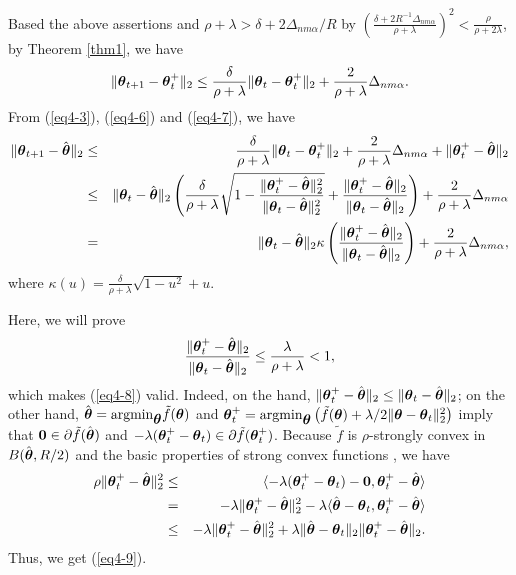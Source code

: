 \documentclass[12pt,a4paper]{article}%
\newcommand{\be}{\begin{equation}}
\newcommand{\ee}{\end{equation}}
\newcommand\bes{\begin{eqnarray}}
\newcommand\ees{\end{eqnarray}}
\newcommand \vc[1]{{\mbox{\boldmath${#1}$}}}
\newcommand \vtheta{\vc \theta}
\numberwithin{equation}{section}
\newcommand{\sbr}[1]{\left(#1\right)}        %
\begin{document}
Based the above assertions and $\rho+\lambda>\delta+2\Delta_{nm\alpha}/R$ by $\sbr{\frac{\delta+2R^{-1}\Delta_{nm\alpha}}{\rho+\lambda}}^2<\frac{\rho}{\rho+2\lambda}$, by Theorem \ref{thm1}, we have
\be\label{eq4-7}
\|\vtheta_{t+1}-\vtheta_t^+\|_2\leq \frac{\delta}{\rho+\lambda}\|\vtheta_t-\vtheta_t^+\|_2+\frac{2}{\rho+\lambda}\Delta_{nm\alpha}.
\ee
From (\ref{eq4-3}), (\ref{eq4-6}) and (\ref{eq4-7}), we have
\bes\label{eq4-8}
\|\vtheta_{t+1}-\hat{\vtheta}\|_2&\leq& \frac{\delta}{\rho+\lambda}\|\vtheta_t-\vtheta_t^+\|_2+\frac{2}{\rho+\lambda}\Delta_{nm\alpha}+\|\vtheta_t^+-\hat{\vtheta}\|_2\nonumber\\
&\leq&\|\vtheta_t-\hat{\vtheta}\|_2\sbr{\frac{\delta}{\rho+\lambda}\sqrt{1-\frac{\|\vtheta_t^+-\hat{\vtheta}\|_2^2}{\|\vtheta_t-\hat{\vtheta}\|_2^2}}
+\frac{\|\vtheta_t^+-\hat{\vtheta}\|_2}{\|\vtheta_t-\hat{\vtheta}\|_2}}+\frac{2}{\rho+\lambda}\Delta_{nm\alpha}\nonumber\\
&=&\|\vtheta_t-\hat{\vtheta}\|_2\kappa\sbr{\frac{\|\vtheta_t^+-\hat{\vtheta}\|_2}{\|\vtheta_t-\hat{\vtheta}\|_2}}+\frac{2}{\rho+\lambda}\Delta_{nm\alpha},
\ees
where $\kappa(u)=\frac{\delta}{\rho+\lambda}\sqrt{1-u^2}+u$.

Here, we will prove
\be\label{eq4-9}
\frac{\|\vtheta_t^+-\hat{\vtheta}\|_2}{\|\vtheta_t-\hat{\vtheta}\|_2}\leq \frac{\lambda}{\rho+\lambda}<1,
\ee
which makes (\ref{eq4-8}) valid. Indeed, on the hand, $\|\vtheta_t^+-\hat{\vtheta}\|_2
\leq\|\vtheta_t-\hat{\vtheta}\|_2$; on the other hand, $\hat{\vtheta}=\mathrm{argmin}_\vtheta\tilde{f}(\vtheta)$ and $\vtheta_t^+=\mathrm{argmin}_\vtheta\sbr{\tilde{f}(\vtheta)+\lambda/2\|\vtheta-\vtheta_t\|_2^2}$ imply that $\vc 0\in \partial\tilde{f}(\hat{\vtheta})$ and $-\lambda(\vtheta_t^+-\vtheta_t)\in\partial\tilde{f}(\vtheta_t^+)$.
Because $\tilde{f}$ is $\rho$-strongly convex in $B(\hat{\vtheta},R/2)$ and the basic properties of strong convex functions \citep{Nesterov2004}, we have
\bes
\rho\|\vtheta_t^+-\hat{\vtheta}\|_2^2&\leq& \langle-\lambda(\vtheta_t^+-\vtheta_t)-\vc 0,\vtheta_t^+-\hat{\vtheta}\rangle\nonumber\\
&=&-\lambda\|\vtheta_t^+-\hat{\vtheta}\|_2^2-\lambda\langle\hat{\vtheta}-\vtheta_t,\vtheta_t^+-\hat{\vtheta}\rangle\nonumber\\
&\leq&-\lambda\|\vtheta_t^+-\hat{\vtheta}\|_2^2+\lambda\|\hat{\vtheta}-\vtheta_t\|_2\|\vtheta_t^+-\hat{\vtheta}\|_2.\nonumber
\ees
Thus, we get (\ref{eq4-9}).
\end{document}
